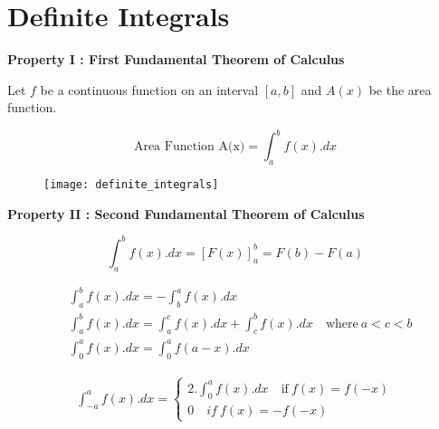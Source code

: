\section{ Definite Integrals}

\textbf{Property I : First Fundamental Theorem of Calculus}

\vspace{5mm}
Let $f$ be a continuous function on an interval $[a,b]$ and $A(x)$ be the area function.

\vspace{2mm}

\begin{tcolorbox}
\begin{center}
\[ \text{Area Function A(x)} = \int_{a}^{b} f(x).dx \]
\end{center}
\end{tcolorbox}

\begin{figure}[ht]
    \centering
    \texttt{[image: definite\_integrals]} 
    \label{definite_int}
\end{figure}

\textbf{Property II : Second Fundamental Theorem of Calculus}

\vspace{5mm}

\begin{tcolorbox}
\begin{center}
\[\int_{a}^{b} f(x).dx = [F(x)]^{b}_{a} = F(b) - F(a) \]
\end{center}
\end{tcolorbox}

\vspace{5mm}

\begin{align}
&\int^{b}_{a} f(x).dx = - \int^{a}_{b} f(x).dx \\[5mm]
&\int^{b}_{a} f(x).dx = \int^{c}_{a} f(x).dx + \int^{b}_{c} f(x).dx \quad \text{where} \: a<c<b \\[5mm]
&\int^{a}_{0}f(x).dx = \int^{a}_{0}f(a-x).dx
\end{align}


\begin{align}
\int^{a}_{-a}f(x).dx = 
\begin{cases}
2.\int^{a}_{0} f(x).dx \quad \text{if} \: f(x) = f(-x) \\
0 \quad if \: f(x) = -f(-x) 
\end{cases}
\end{align}

